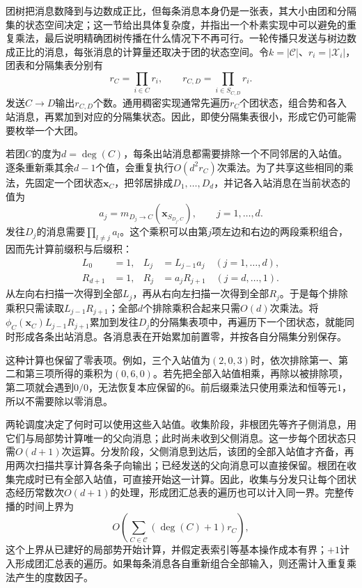团树把消息数降到与边数成正比，但每条消息本身仍是一张表，其大小由团和分隔集的状态空间决定；这一节给出具体复杂度，并指出一个朴素实现中可以避免的重复乘法，最后说明精确团树传播在什么情况下不再可行。一轮传播只发送与树边数成正比的消息，每张消息的计算量还取决于团的状态空间。令$k=|\mathcal C|$、$r_i=|\mathcal X_i|$，团表和分隔集表分别有
\begin{equation}
  r_C=\prod_{i\in C}r_i,\qquad
  r_{C,D}=\prod_{i\in S_{C,D}}r_i.
  \label{eq:pgm-junction-tree-table-sizes}
\end{equation}
发送$C\to D$输出$r_{C,D}$个数。通用稠密实现通常先遍历$r_C$个团状态，组合势和各入站消息，再累加到对应的分隔集状态。因此，即使分隔集表很小，形成它仍可能需要枚举一个大团。

若团$C$的度为$d=\deg(C)$，每条出站消息都需要排除一个不同邻居的入站值。逐条重新乘其余$d-1$个值，会重复执行$O(d^2r_C)$次乘法。为了共享这些相同的乘法，先固定一个团状态$\bm{x}_C$，把邻居排成$D_1,\ldots,D_d$，并记各入站消息在当前状态的值为
\[
  a_j=m_{D_j\to C}(\bm{x}_{S_{D_j,C}}),
  \qquad j=1,\ldots,d.
\]
发往$D_j$的消息需要$\prod_{l\neq j}a_l$。这个乘积可以由第$j$项左边和右边的两段乘积组合，因而先计算前缀积与后缀积：
\begin{equation}
  \begin{aligned}
    L_0&=1,&L_j&=L_{j-1}a_j\quad(j=1,\ldots,d),\\
    R_{d+1}&=1,&R_j&=a_jR_{j+1}\quad(j=d,\ldots,1).
  \end{aligned}
  \label{eq:pgm-junction-tree-prefix-suffix}
\end{equation}
从左向右扫描一次得到全部$L_j$，再从右向左扫描一次得到全部$R_j$。于是每个排除乘积只需读取$L_{j-1}R_{j+1}$；全部$d$个排除乘积合起来只需$O(d)$次乘法。将$\phi_C(\bm{x}_C)L_{j-1}R_{j+1}$累加到发往$D_j$的分隔集表项中，再遍历下一个团状态，就能同时形成各条出站消息。各消息表在开始累加前置零，并按各自分隔集分别保存。

这种计算也保留了零表项。例如，三个入站值为$(2,0,3)$时，依次排除第一、第二和第三项所得的乘积为$(0,6,0)$。若先把全部入站值相乘，再除以被排除项，第二项就会遇到$0/0$，无法恢复本应保留的$6$。前后缀乘法只使用乘法和恒等元$1$，所以不需要除以零消息。

两轮调度决定了何时可以使用这些入站值。收集阶段，非根团先等齐子侧消息，用它们与局部势计算唯一的父向消息；此时尚未收到父侧消息。这一步每个团状态只需$O(d+1)$次运算。分发阶段，父侧消息到达后，该团的全部入站值才齐备，再用两次扫描共享计算各条子向输出；已经发送的父向消息可以直接保留。根团在收集完成时已有全部入站值，可直接开始这一计算。因此，收集与分发只让每个团状态经历常数次$O(d+1)$的处理，形成团汇总表的遍历也可以计入同一界。完整传播的时间上界为
\begin{equation}
  O\!\left(\sum_{C\in\mathcal{C}}(\deg(C)+1)r_C\right),
  \label{eq:pgm-junction-tree-time}
\end{equation}
这个上界从已建好的局部势开始计算，并假定表索引等基本操作成本有界；$+1$计入形成团汇总表的遍历。如果每条消息各自重新组合全部输入，则还需计入重复乘法产生的度数因子。

